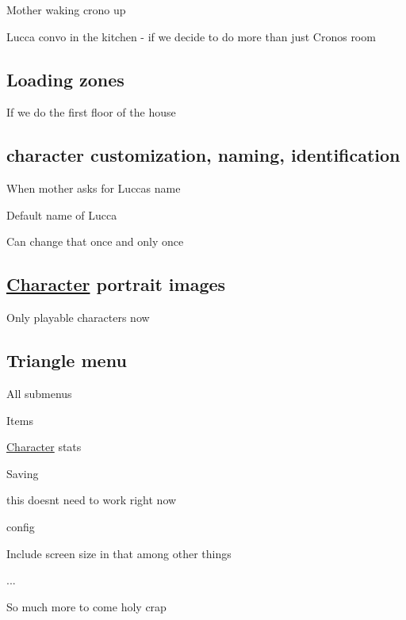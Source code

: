 \begin{DoxyItemize}
\item Mother waking crono up
\item Lucca convo in the kitchen -\/ if we decide to do more than just Crono\textquotesingle{}s room
\end{DoxyItemize}

\subsection*{Loading zones}


\begin{DoxyItemize}
\item If we do the first floor of the house
\end{DoxyItemize}

\subsection*{character customization, naming, identification}


\begin{DoxyItemize}
\item When mother asks for Lucca\textquotesingle{}s name
\begin{DoxyItemize}
\item Default name of Lucca
\item Can change that once and only once
\end{DoxyItemize}
\end{DoxyItemize}

\subsection*{\hyperlink{classCharacter}{Character} portrait images}


\begin{DoxyItemize}
\item Only playable characters now
\end{DoxyItemize}

\subsection*{Triangle menu}


\begin{DoxyItemize}
\item All submenus
\begin{DoxyItemize}
\item Items
\item \hyperlink{classCharacter}{Character} stats
\item Saving
\begin{DoxyItemize}
\item this doesn\textquotesingle{}t need to work right now
\end{DoxyItemize}
\item config
\begin{DoxyItemize}
\item Include screen size in that among other things
\end{DoxyItemize}
\end{DoxyItemize}
\end{DoxyItemize}

...

So much more to come holy crap 